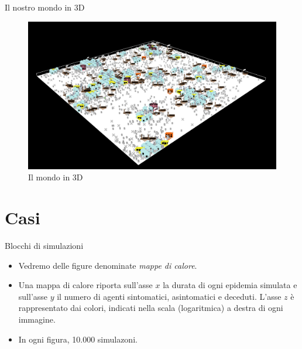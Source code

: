 \documentclass[]{beamer}
\begin{document}
\begin{frame}{Il nostro mondo in 3D}

\begin{figure}[H]
\center
\includegraphics[scale=0.55]{world3D.png}

\caption{Il mondo in 3D}
\label{world3D}
\end{figure}

\end{frame}


\section{Casi}

\begin{frame}{Blocchi di simulazioni}

  \begin{itemize}
  \item
Vedremo delle figure denominate \emph{mappe di calore}.

\item
Una mappa di calore riporta sull'asse $x$ la durata di ogni epidemia simulata e sull'asse $y$ il numero di agenti sintomatici, asintomatici e deceduti. L'asse $z$ \`{e} rappresentato dai colori, indicati nella scala (logaritmica) a destra di ogni immagine.

\item
In ogni figura, 10.000 simulazoni.

\end{itemize}
\end{frame}

\end{document}
